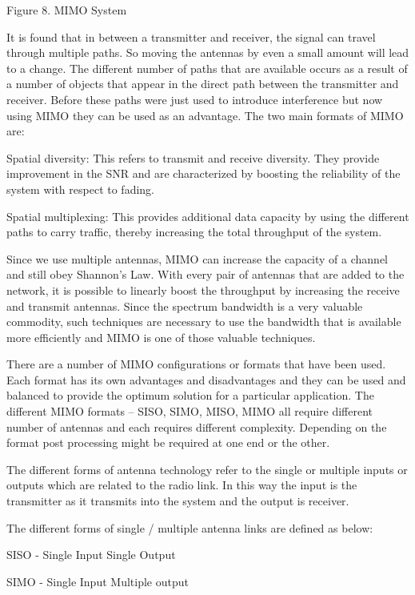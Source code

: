                                                       Figure 8. MIMO System

It is found that in between a transmitter and receiver, the signal can travel through multiple paths. So moving the antennas by even a small amount will lead to a change. The different number of paths that are available occurs as a result of a number of objects that appear in the direct path between the transmitter and receiver. Before these paths were just used to introduce interference but now using MIMO they can be used as an advantage. The two main formats of MIMO are: 

	Spatial diversity: This refers to transmit and receive diversity. They provide improvement in the SNR and are characterized by boosting the reliability of the system with respect to fading. 

	Spatial multiplexing: This provides additional data capacity by using the different paths to carry traffic, thereby increasing the total throughput of the system. 

Since we use multiple antennas, MIMO can increase the capacity of a channel and still obey Shannon’s Law. With every pair of antennas that are added to the network, it is possible to linearly boost the throughput by increasing the receive and transmit antennas. Since the spectrum bandwidth is a very valuable commodity, such techniques are necessary to use the bandwidth that is available more efficiently and MIMO is one of those valuable techniques.

There are a number of MIMO configurations or formats that have been used. Each format has its own advantages and disadvantages and they can be used and balanced to provide the optimum solution for a particular application. The different MIMO formats – SISO, SIMO, MISO, MIMO all require different number of antennas and each requires different complexity. Depending on the format post processing might be required at one end or the other.

The different forms of antenna technology refer to the single or multiple inputs or outputs which are related to the radio link. In this way the input is the transmitter as it transmits into the system and the output is receiver.



The different forms of single / multiple antenna links are defined as below:

	SISO - Single Input Single Output

	SIMO - Single Input Multiple output

